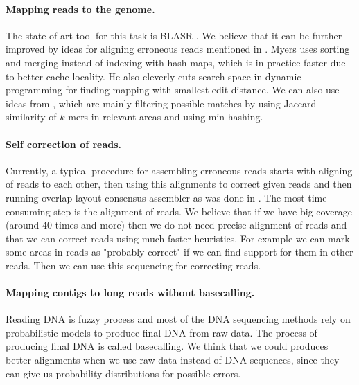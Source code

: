 \paragraph{Mapping reads to the genome.} The state of art tool
for this task is BLASR \citep{BLASR}. We believe
that it can be further improved by ideas for aligning erroneous reads
mentioned in \citet{myers2014efficient}. 
Myers uses sorting and merging instead of indexing with hash maps,
which is in practice faster due to better cache locality.
He also cleverly cuts search space in dynamic programming for finding mapping
with smallest edit distance.
We can also use ideas from \cite{MHAP}, which are mainly filtering
possible matches by using Jaccard similarity of $k$-mers in relevant areas
and using min-hashing.

\paragraph{Self correction of reads.}
Currently, a typical procedure for assembling erroneous reads
starts with aligning of reads to each other, then using this alignments
to correct given reads and then running overlap-layout-consensus assembler
as was done in \cite{MHAP}.
The most time consuming step is the alignment of reads.
We believe that if we have big coverage (around $40$ times and more) then
we do not need precise alignment of reads and that we can
correct reads using much faster heuristics. For example
we can mark some areas in reads as "probably correct" if we can
find support for them in other reads. Then we can
use this sequencing for correcting reads.

\paragraph{Mapping contigs to long reads without basecalling.}
Reading DNA is fuzzy process and most of the DNA sequencing
methods rely on probabilistic models to produce final DNA
from raw data. The process of producing final DNA is called basecalling.
We think that we could produces better alignments when
we use raw data instead of DNA sequences, since they can give
us probability distributions for possible errors. 

\label{LastPage}

